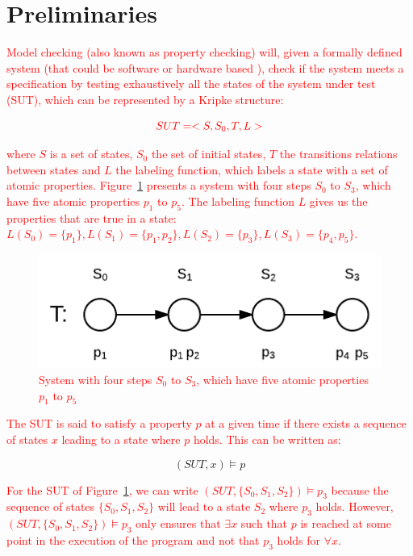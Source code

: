 \documentclass[times, doublespace]{smrauth}
\newcommand{\red}[1]{\textcolor{red}{#1}}
\begin{document}
\section{Preliminaries\label{sec:prelimenaries}}

\red{Model checking (also known as property checking) will, given a formally defined system
(that could be software \cite{Visser2003} or hardware based
\cite{kropf1999introduction}), check if the system meets a specification
by testing exhaustively all the states of the system under test (SUT),
which can be represented by a Kripke \cite{Kripke1963} structure:}

\begin{equation}
\red{SUT = <S, S_0, T, L>}
\end{equation}

\noindent \red{where $S$ is a set of states, $S_0$ the set of initial states, $T$ the transitions relations between states and $L$ the labeling function, which labels a state with a set of atomic properties.
Figure~\ref{fig:mc-def} presents a system with four steps $S_0$ to $S_3$, which have five atomic properties $p_1$ to $p_5$.
The labeling function $L$ gives us the properties that are true in a state: $L(S_0) = \{p_1\}, L(S_1) = \{p_1, p_2\}, L(S_2) = \{p_3\}, L(S_3) = \{p_4, p_5\}$.}

\begin{figure}[h!]
  \centering
    \includegraphics[scale=0.4]{media/mc-def.png}
    \caption{\red{System with four steps $S_0$ to $S_3$, which have five atomic properties $p_1$ to $p_5$}
    \label{fig:mc-def}}
\end{figure}


\red{The SUT is said to satisfy a property $p$ at a given time if there exists a sequence of states $x$ leading to a state where $p$ holds.
This can be written as:}

\begin{equation}
(SUT, x) \models p
\end{equation}

\red{For the SUT of Figure~\ref{fig:mc-def}, we can write $(SUT, \{S_0, S_1, S_2\}) \models p_3$ because the sequence of states $\{S_0, S_1, S_2\}$ will lead to a state $S_2$ where $p_3$ holds. However, $(SUT, \{S_0, S_1, S_2\}) \models p_3$ only ensures that $\exists x$ such that $p$ is reached
at some point in the execution of the program and not that $p_3$ holds
for $\forall x$.}
\end{document}
